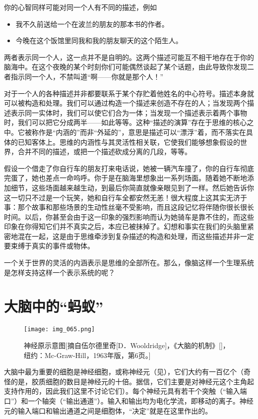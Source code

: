 你的心智同样可能对同一个人有不同的描述，例如
\begin{itemize}
\item 我不久前送给一个在波兰的朋友的那本书的作者。
\item 今晚在这个饭馆里同我和我的朋友聊天的这个陌生人。
\end{itemize}
两者表示同一个人，这一点并不是自明的。这两个描述可能互不相干地存在于你的脑海中。在这个夜晚的某个时刻你们可能偶然谈起了某个话题，由此导致你发现二者指示同一个人，不禁叫道“啊——你就是那个人！”

对于一个人的各种描述并非都要联系于某个存贮着他姓名的中心符号。描述本身就可以被构造和处理。我们可以通过构造一个描述来创造不存在的人；当发现两个描述表示同一实体时，我们可以使它们合为一体；当发现一个描述表示着两个事物时，我们可以把它分成两半——如此等等。这种“描述的演算”存在于思维的核心之中。它被称作是“内涵的”而非“外延的”，意思是描述可以“漂浮”着，而不落实在具体的已知客体上。思维的内涵性与其灵活性相关联，它使我们能够想象假设的世界，合并不同的描述，或把一个描述砍成分离的几段，等等。

假设一个借走了你自行车的朋友打来电话说，她被一辆汽车撞了，你的自行车彻底完蛋了，她也差点一命呜呼。你于是在脑海里想象出一系列场面。随着她不断地添加细节，这些场面越来越生动，到最后你简直就像亲眼见到了一样。然后她告诉你这一切只不过是一个玩笑，她和自行车全都安然无恙！很大程度上这其实无济于事：那个故事和那些场景的生动性丝毫不受影响，而且这段记忆将伴随你很长很长时间。以后，你甚至会由于这一印象的强烈影响而认为她骑车是靠不住的，而这些印象在你得知它们并不真实之后，本应已被抹掉了。幻想和事实在我们的头脑里紧密地混在一起，这是由于思维牵涉到复杂描述的构造和处理，而这些描述并非一定要束缚于真实的事件或物体。

一个关于世界的灵活的内涵表示是思维的全部所在。那么，像脑这样一个生理系统是怎样支持这样一个表示系统的呢？

\section{大脑中的“蚂蚁”}

\begin{figure}
\texttt{[image: img\_065.png]}
\caption[神经元示意图。]
  {神经原示意图[摘自伍尔德里奇[D．Wooldridge]，《大脑的机制》[]，纽约：Mc-Graw-Hill，1963年版，第6页。]}
\end{figure}

大脑中最为重要的细胞是神经细胞，或称神经元（见），它们大约有一百亿个（奇怪的是，胶质细胞的数目是神经元的十倍。据信，它们主要是对神经元这个主角起支持作用的，因此我们这里不讨论它们）。每个神经元具有若干个突触（“输入端口”）和一个轴突（“输出通道”）。输入和输出均为电化学流，即移动的离子。神经元的输入端口和输出通道之间是细胞体，“决定”就是在这里作出的。

